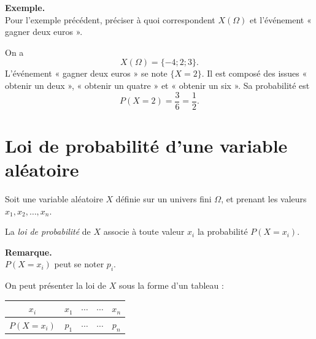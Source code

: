 \documentclass[11pt]{article}
\newenvironment{remarque}{\par\smallskip\noindent\textbf{Remarque. \\}\ignorespaces}{\par\smallskip}
\newenvironment{exemple}{\par\smallskip\noindent\textbf{Exemple. \\}\ignorespaces}{\par\smallskip}
\begin{document}
\begin{exemple}
Pour l'exemple précédent, préciser à quoi correspondent $X(\Omega)$ et l'événement « gagner deux euros ».

On a
\[
X(\Omega)=\{-4;2;3\}.
\]
L'événement « gagner deux euros » se note $\{X=2\}$. Il est composé des issues « obtenir un deux », « obtenir un quatre » et « obtenir un six ». Sa probabilité est
\[
P(X=2)=\frac{3}{6}=\frac12.
\]
\end{exemple}

\section{Loi de probabilité d'une variable aléatoire}

\begin{definition}
Soit une variable aléatoire $X$ définie sur un univers fini $\Omega$, et prenant les valeurs $x_1,x_2,\ldots,x_n$.

La \emph{loi de probabilité} de $X$ associe à toute valeur $x_i$ la probabilité $P(X=x_i)$.
\end{definition}

\begin{remarque}
$P(X=x_i)$ peut se noter $p_i$.
\end{remarque}

On peut présenter la loi de $X$ sous la forme d'un tableau :
\begin{center}
\renewcommand{\arraystretch}{1.4}
\begin{tabular}{c|cccc}
$x_i$ & $x_1$ & $\cdots$ & $\cdots$ & $x_n$ \\
\hline
$P(X=x_i)$ & $p_1$ & $\cdots$ & $\cdots$ & $p_n$
\end{tabular}
\end{center}
\end{document}
